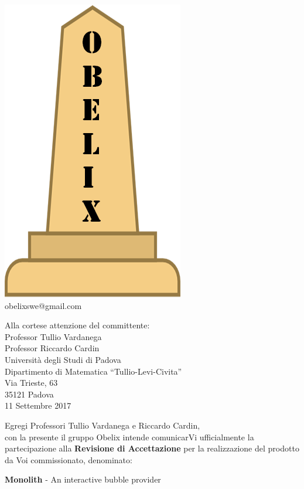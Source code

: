 \documentclass[10pt,stdletter,dateno,sigright]{newlfm} %
\begin{document}
\begin{minipage}[adjusting]{.3\textwidth}
  \begin{centering}
    \includegraphics[width=.5\textwidth]{../../file_comuni/immagini/obelisk_sample_02.png}
    \\
    obelixswe@gmail.com
  \end{centering}
\end{minipage}


\begin{flushright}
  Alla cortese attenzione del committente: \\
\vspace{0.08in}
  Professor Tullio Vardanega \\
  Professor Riccardo Cardin \\
  Università degli Studi di Padova \\
  Dipartimento di Matematica ``Tullio-Levi-Civita''\\
  Via Trieste, 63 \\
  35121 Padova \\
\vspace{0.08in}
  11 Settembre 2017 \\
\end{flushright}
\vspace{0.1in}
Egregi Professori Tullio Vardanega e Riccardo Cardin,\\
con la presente il gruppo Obelix intende comunicarVi ufficialmente
la partecipazione alla \textbf{Revisione di Accettazione} per la realizzazione del prodotto da Voi commissionato, denominato:
\begin{center}
	\textbf{Monolith} - An interactive bubble provider
\end{center}
\vspace{.05in}
\end{document}
